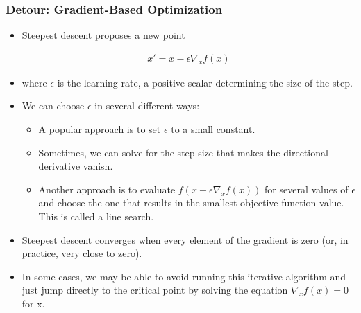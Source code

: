 \documentclass[
  shownotes,
  xcolor={svgnames},
  hyperref={colorlinks,citecolor=DarkBlue,linkcolor=DarkRed,urlcolor=DarkBlue}
  , aspectratio=169]{beamer}
\begin{document}
\begin{frame}[fragile]
\frametitle{Detour: Gradient-Based Optimization}

\begin{itemize}
\item Steepest descent proposes a new point

\begin{align}
x'=x-\epsilon \nabla_x f(x)
\end{align}
\item where $\epsilon$ is the learning rate, a positive scalar determining the size of the step. 

\item We can choose $\epsilon$ in several different ways:
\begin{itemize}
\item A popular approach is to set $\epsilon$ to a small constant. 
 \item Sometimes, we can solve for the step size that makes the directional derivative vanish. 
 \item Another approach is to evaluate $f(x-\epsilon \nabla_x f(x))$ for several values of 
 $\epsilon$ and choose the one that results in the smallest objective function value. This  is called a line search.
\end{itemize}
 

\item Steepest descent converges when every element of the gradient is zero (or, in practice, very close to zero). 
\item In some cases, we may be able to avoid running this iterative algorithm and just jump directly to the critical point by solving the equation $\nabla_x f(x)=0$ for x.

\end{itemize}

 \end{frame}
\end{document}
